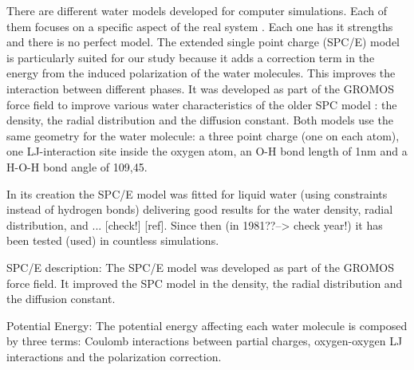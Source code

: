 There are different water models developed for computer simulations.
Each of them focuses on a specific aspect of the real system \cite{berendsen:1987}.
Each one has it strengths and there is no perfect model. The extended
single point charge (SPC/E) model is particularly suited for our study
because it adds a correction term in the energy from the induced polarization
of the water molecules. This improves the interaction between different
phases. It was developed as part of the GROMOS force field to improve
various water characteristics of the older SPC model \cite{berendsen:1981}:
the density, the radial distribution and the diffusion constant. Both
models use the same geometry for the water molecule: a three point
charge (one on each atom), one LJ-interaction site inside the oxygen
atom, an O-H bond length of 1nm and a H-O-H bond angle of 109,45\textdegree .

In its creation the SPC/E model was fitted for liquid water (using
constraints instead of hydrogen bonds) delivering good results for
the water density, radial distribution, and ... {[}check!{]} {[}ref{]}.
Since then (in 1981??--> check year!) it has been tested (used) in
countless simulations.

SPC/E description: The SPC/E model was developed as part of the GROMOS
force field. It improved the SPC model in the density, the radial
distribution and the diffusion constant.

Potential Energy: The potential energy affecting each water molecule
is composed by three terms: Coulomb interactions between partial charges,
oxygen-oxygen LJ interactions and the polarization correction.